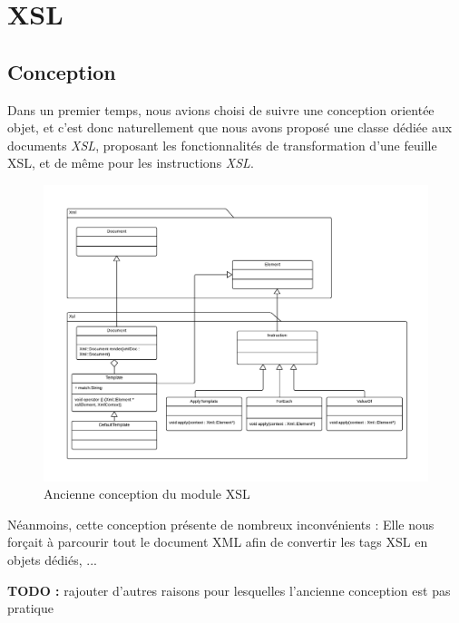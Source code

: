 \chapter{XSL}

\section{Conception}

Dans un premier temps, nous avions choisi de suivre une conception orientée objet, et c'est donc
naturellement que nous avons proposé une classe dédiée aux documents \textit{XSL}, proposant les
fonctionnalités de transformation d'une feuille XSL, et de même pour les instructions \textit{XSL}.

\begin{figure}[h!]
    \centering
    \includegraphics[width=\linewidth]{images/xsl-uml-old.pdf}
    \caption{Ancienne conception du module XSL}
    \label{oldXslClassDiagram}
\end{figure}

Néanmoins, cette conception présente de nombreux inconvénients : Elle nous forçait à parcourir tout le document XML afin de convertir les tags XSL en objets dédiés, ...

\textbf{TODO : } rajouter d'autres raisons pour lesquelles l'ancienne conception est pas pratique

